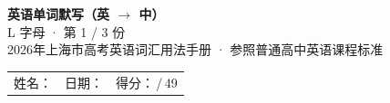 \documentclass[10pt,a4paper]{article}
\begin{document}
\pagestyle{plain}

\begin{center}
{\LARGE\bfseries 英语单词默写（英 $\to$ 中）}\\[0.22em]
{\large L 字母 · 第 1 / 3 份}\\[0.18em]
{\small 2026年上海市高考英语词汇用法手册 · 参照普通高中英语课程标准}
\end{center}

\vspace{0.25em}
\noindent\begin{tabular}{@{}p{}@{}p{}@{}p{}@{}}
姓名：\underline{\hspace{2.0cm}} & 日期：\underline{\hspace{2.0cm}} & 得分：\underline{\hspace{1.3cm}}\,/\,49 \\
\end{tabular}

\vspace{0.3em}

\vspace{0.08em}
\end{document}
